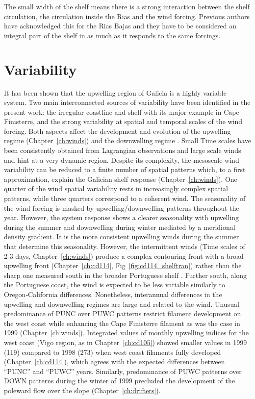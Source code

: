 The small width of the shelf means there is a strong interaction
between the shelf circulation, the circulation inside the Rias and
the wind forcing. Previous authors have acknowledged this for the
Rias Bajas \citep[e.g.][]{Gomez-Gesteira01,Prego01,Sordo01} and
they have to be considered an integral part of the shelf in as
much as it responds to the same forcings.



\section{Variability} It has been shown that the upwelling region
of Galicia is a highly variable system. Two main interconnected
sources of variability have been identified in the present work:
the irregular coastline and shelf with its major example in Cape
Finisterre, and the strong variability at spatial and temporal
scales of the wind forcing. Both aspects affect the development
and evolution of the upwelling regime (Chapter~\ref{ch:winds})
\citep[e.g.][]{Barth00,Samelson02} and the downwelling regime
\citep[e.g.][]{Dubert98}. Small Time scales have been consistently
obtained from Lagrangian observations and large scale winds and
hint at a very dynamic region. Despite its complexity, the
mesoscale wind variability can be reduced to a finite number of
spatial patterns which, to a first approximation, explain the
Galician shelf response (Chapter~\ref{ch:winds}). One quarter of
the wind spatial variability rests in increasingly complex spatial
patterns, while three quarters correspond to a coherent wind. The
seasonality of the wind forcing is masked by upwelling/downwelling
patterns throughout the year. However, the system response shows a
clearer seasonality with upwelling during the summer and
downwelling during winter mediated by a meridional density
gradient. It is the more consistent upwelling winds during the
summer that determine this seasonality. However, the intermittent
winds (Time scales of 2-3 days, Chapter~\ref{ch:winds}) produce a
complex contouring front with a broad upwelling front
(Chapter~\ref{ch:cd114}, Fig~\ref{fig:cd114_shelftran}) rather
than the sharp one measured south in the broader Portuguese shelf
\citep{Peliz02}. Further south, along the Portuguese coast, the
wind is expected to be less variable  similarly to
Oregon-California differences. Nonetheless, interannual
differences in the upwelling and downwelling regimes are large
\citep{Huthnance02} and related to the wind. Unusual predominance
of PUNC over PUWC patterns restrict filament development on the
west coast while enhancing the Cape Finisterre filament as was the
case in 1999 (Chapter~\ref{ch:winds}). Integrated values of
monthly upwelling indices for the west coast (Vigo region, as in
Chapter~\ref{ch:cd105}) showed smaller values in 1999 (119)
compared to 1998 (273) when west coast filaments fully developed
(Chapter~\ref{ch:cd114}), which agrees with the expected
differences between ``PUNC'' and ``PUWC'' years. Similarly,
predominance of PUWC patterns over DOWN patterns during the winter
of 1999 precluded the development of the poleward flow over the
slope (Chapter~\ref{ch:drifters}).

